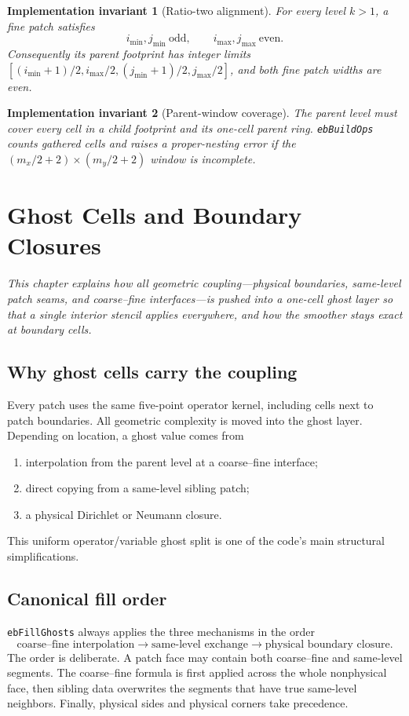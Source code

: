 \documentclass[11pt,oneside,openany]{book}
\newcommand{\code}[1]{\textnormal{\texttt{#1}}}
\newtheorem{invariant}{Implementation invariant}[chapter]
\begin{document}
\begin{invariant}[Ratio-two alignment]
For every level $k>1$, a fine patch satisfies
\[
 i_{\min},j_{\min}\ \text{odd},\qquad i_{\max},j_{\max}\ \text{even}.
\]
Consequently its parent footprint has integer limits
$[(i_{\min}+1)/2,i_{\max}/2,(j_{\min}+1)/2,j_{\max}/2]$, and both fine patch widths are even.
\end{invariant}

\begin{invariant}[Parent-window coverage]
The parent level must cover every cell in a child footprint and its one-cell parent ring. \code{ebBuildOps} counts gathered cells and raises a proper-nesting error if the $(m_x/2+2)\times(m_y/2+2)$ window is incomplete.
\end{invariant}


\chapter{Ghost Cells and Boundary Closures}
\label{chap:ghosts}

\emph{This chapter explains how all geometric coupling---physical boundaries, same-level patch seams, and coarse--fine interfaces---is pushed into a one-cell ghost layer so that a single interior stencil applies everywhere, and how the smoother stays exact at boundary cells.}

\section{Why ghost cells carry the coupling}
Every patch uses the same five-point operator kernel, including cells next to patch boundaries. All geometric complexity is moved into the ghost layer. Depending on location, a ghost value comes from
\begin{enumerate}[label=\arabic*.]
\item interpolation from the parent level at a coarse--fine interface;
\item direct copying from a same-level sibling patch;
\item a physical Dirichlet or Neumann closure.
\end{enumerate}
This uniform operator/variable ghost split is one of the code's main structural simplifications.

\section{Canonical fill order}
\code{ebFillGhosts} always applies the three mechanisms in the order
\[
  \boxed{\text{coarse--fine interpolation}}
  \longrightarrow
  \boxed{\text{same-level exchange}}
  \longrightarrow
  \boxed{\text{physical boundary closure}}.
\]
The order is deliberate. A patch face may contain both coarse--fine and same-level segments. The coarse--fine formula is first applied across the whole nonphysical face, then sibling data overwrites the segments that have true same-level neighbors. Finally, physical sides and physical corners take precedence.
\end{document}
